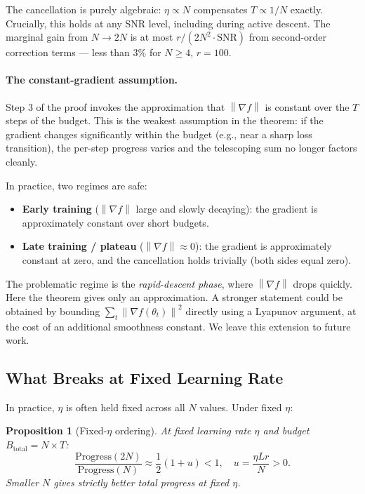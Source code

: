\documentclass[11pt]{article}
\newtheorem{proposition}{Proposition}
\theoremstyle{definition}
\theoremstyle{remark}
\newcommand{\norm}[1]{\left\|#1\right\|}
\newcommand{\SNR}{\mathrm{SNR}}
\begin{document}
The cancellation is purely algebraic: $\eta \propto N$ compensates $T \propto 1/N$ exactly. Crucially, this holds at any SNR level, including during active descent. The marginal gain from $N \to 2N$ is at most $r/(2N^2 \cdot \SNR)$ from second-order correction terms --- less than $3\%$ for $N \geq 4$, $r = 100$.

\paragraph{The constant-gradient assumption.}
Step 3 of the proof invokes the approximation that $\norm{\nabla f}$ is constant over the $T$ steps of the budget. This is the weakest assumption in the theorem: if the gradient changes significantly within the budget (e.g., near a sharp loss transition), the per-step progress varies and the telescoping sum no longer factors cleanly.

In practice, two regimes are safe:
\begin{itemize}[leftmargin=*]
  \item \textbf{Early training} ($\norm{\nabla f}$ large and slowly decaying): the gradient is approximately constant over short budgets.
  \item \textbf{Late training / plateau} ($\norm{\nabla f} \approx 0$): the gradient is approximately constant at zero, and the cancellation holds trivially (both sides equal zero).
\end{itemize}
The problematic regime is the \emph{rapid-descent phase}, where $\norm{\nabla f}$ drops quickly. Here the theorem gives only an approximation. A stronger statement could be obtained by bounding $\sum_t \norm{\nabla f(\theta_t)}^2$ directly using a Lyapunov argument, at the cost of an additional smoothness constant. We leave this extension to future work.

\subsection{What Breaks at Fixed Learning Rate}

In practice, $\eta$ is often held fixed across all $N$ values. Under fixed $\eta$:

\begin{proposition}[Fixed-$\eta$ ordering]
\label{prop:fixed-eta}
At fixed learning rate $\eta$ and budget $B_{\mathrm{total}} = N \times T$:
\begin{equation}
  \frac{\mathrm{Progress}(2N)}{\mathrm{Progress}(N)} \approx \frac{1}{2}(1+u) < 1, \quad u = \frac{\eta L r}{N} > 0.
  \label{eq:fixed-eta-ratio}
\end{equation}
Smaller $N$ gives strictly better total progress at fixed $\eta$.
\end{proposition}
\end{document}
